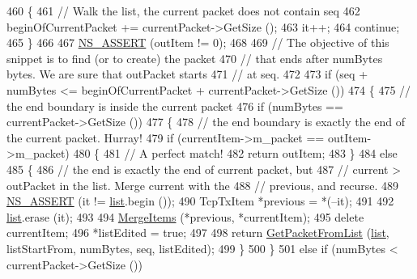 \begin{DoxyCode}
460         \{
461           \textcolor{comment}{// Walk the list, the current packet does not contain seq}
462           beginOfCurrentPacket += currentPacket->GetSize ();
463           it++;
464           \textcolor{keywordflow}{continue};
465         \}
466 
467       \hyperlink{assert_8h_a6dccdb0de9b252f60088ce281c49d052}{NS\_ASSERT} (outItem != 0);
468 
469       \textcolor{comment}{// The objective of this snippet is to find (or to create) the packet}
470       \textcolor{comment}{// that ends after numBytes bytes. We are sure that outPacket starts}
471       \textcolor{comment}{// at seq.}
472 
473       \textcolor{keywordflow}{if} (seq + numBytes <= beginOfCurrentPacket + currentPacket->GetSize ())
474         \{
475           \textcolor{comment}{// the end boundary is inside the current packet}
476           \textcolor{keywordflow}{if} (numBytes == currentPacket->GetSize ())
477             \{
478               \textcolor{comment}{// the end boundary is exactly the end of the current packet. Hurray!}
479               \textcolor{keywordflow}{if} (currentItem->m\_packet == outItem->m\_packet)
480                 \{
481                   \textcolor{comment}{// A perfect match!}
482                   \textcolor{keywordflow}{return} outItem;
483                 \}
484               \textcolor{keywordflow}{else}
485                 \{
486                   \textcolor{comment}{// the end is exactly the end of current packet, but}
487                   \textcolor{comment}{// current > outPacket in the list. Merge current with the}
488                   \textcolor{comment}{// previous, and recurse.}
489                   \hyperlink{assert_8h_a6dccdb0de9b252f60088ce281c49d052}{NS\_ASSERT} (it != \hyperlink{openflow-interface_8h_afd9bcfa176617760671b67580f536fa7}{list}.begin ());
490                   TcpTxItem *previous = *(--it);
491 
492                   \hyperlink{openflow-interface_8h_afd9bcfa176617760671b67580f536fa7}{list}.erase (it);
493 
494                   \hyperlink{classns3_1_1TcpTxBuffer_aee57c32104926f7d4bfdeb12f05a6db1}{MergeItems} (*previous, *currentItem);
495                   \textcolor{keyword}{delete} currentItem;
496                   *listEdited = \textcolor{keyword}{true};
497 
498                   \textcolor{keywordflow}{return} \hyperlink{classns3_1_1TcpTxBuffer_a0528a0261fe39fdb95526c24801f1091}{GetPacketFromList} (\hyperlink{openflow-interface_8h_afd9bcfa176617760671b67580f536fa7}{list}, listStartFrom, numBytes, seq, 
      listEdited);
499                 \}
500             \}
501           \textcolor{keywordflow}{else} \textcolor{keywordflow}{if} (numBytes < currentPacket->GetSize ())

\end{DoxyCode}
